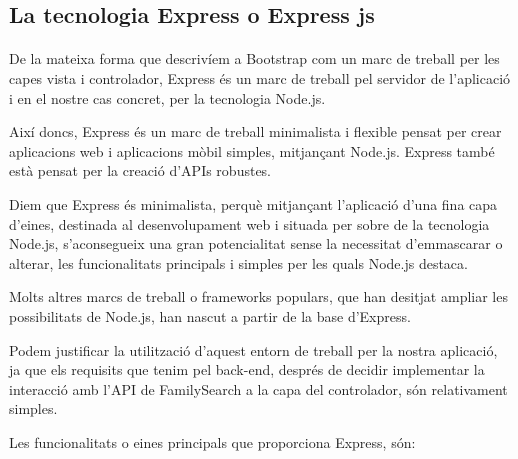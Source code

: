 \subsection{La tecnologia Express o Express js}

    \paragraph{}
    De la mateixa forma que descrivíem a Bootstrap com un marc de treball per les capes vista i controlador, Express és un marc de treball pel servidor de l'aplicació i en el nostre cas concret, per la tecnologia Node.js.

    Així doncs, Express és un marc de treball minimalista i flexible pensat per crear aplicacions web i aplicacions mòbil simples, mitjançant Node.js. Express també està pensat per la creació d'APIs robustes.

    Diem que Express és minimalista, perquè mitjançant l'aplicació d'una fina capa d'eines, destinada al desenvolupament web i situada per sobre de la tecnologia Node.js, s'aconsegueix una gran potencialitat sense la necessitat d'emmascarar o alterar, les funcionalitats principals i simples per les quals Node.js destaca.

    Molts altres marcs de treball o frameworks populars, que han desitjat ampliar les possibilitats de Node.js, han nascut a partir de la base d'Express.

    Podem justificar la utilització d'aquest entorn de treball per la nostra aplicació, ja que els requisits que tenim pel back-end, després de decidir implementar la interacció amb l'API de FamilySearch a la capa del controlador,  són relativament simples.

    Les funcionalitats o eines principals que proporciona Express, són:

